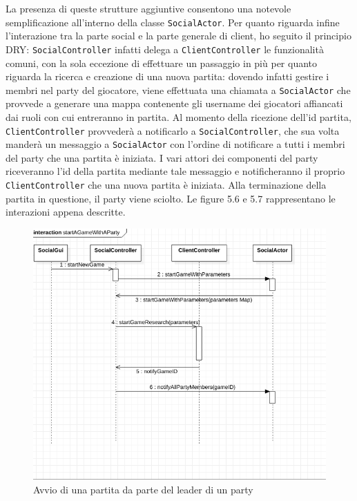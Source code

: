 La presenza di queste strutture aggiuntive consentono una notevole semplificazione all'interno della classe \texttt{SocialActor}.
Per quanto riguarda infine l'interazione tra la parte social e la parte generale di client, ho seguito il principio DRY: \texttt{SocialController} infatti delega a \texttt{ClientController} le funzionalità comuni, con la sola eccezione di effettuare un passaggio in più per quanto riguarda la ricerca e creazione di una nuova partita: dovendo infatti gestire i membri nel party del giocatore, viene effettuata una chiamata a \texttt{SocialActor} che provvede a generare una mappa contenente gli username dei giocatori affiancati dai ruoli con cui entreranno in partita.
Al momento della ricezione dell'id partita, \texttt{ClientController} provvederà a notificarlo a \texttt{SocialController}, che  sua volta manderà un messaggio a \texttt{SocialActor} con l'ordine di notificare a tutti i membri del party che una partita è iniziata. I vari attori dei componenti del party riceveranno l'id della partita mediante tale messaggio e notificheranno il proprio \texttt{ClientController} che una nuova partita è iniziata.
Alla terminazione della partita in questione, il party viene sciolto.
Le figure 5.6 e 5.7 rappresentano le interazioni appena descritte.

\begin{figure}[H]
	\includegraphics[width=\textwidth,height=\textheight,keepaspectratio]{socialStartGame}
	\caption{Avvio di una partita da parte del leader di un party}
\end{figure}

